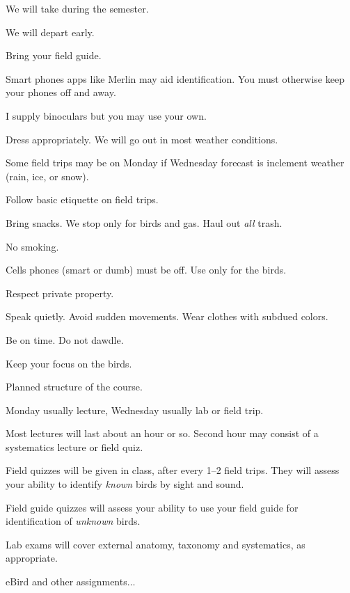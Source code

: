 \documentclass[t]{beamer}
\begin{document}
\begin{frame}[t,plain]{We will take  during the semester.}

	\vspace{-0.5\baselineskip}
	
	\hangpara {}
	
	\hangpara We will depart early. 
	
	\hangpara Bring your field guide.

	\hangpara Smart phones apps like Merlin may aid identification. You must otherwise keep your phones off and away.

	\hangpara I supply binoculars but you may use your own. 

	\hangpara Dress appropriately. We will go out in most weather conditions.
		
	\hangpara Some field trips may be on Monday if Wednesday forecast is inclement weather (rain, ice, or snow).
	
\end{frame}

\begin{frame}[t,plain]{Follow basic etiquette on field trips.}

	\vspace{-0.5\baselineskip}
	
	\hangpara Bring snacks. We stop only for birds and gas. Haul out \textit{all} trash.
	
	\hangpara No smoking.
	
	\hangpara Cells phones (smart or dumb) must be off. Use only for the birds.

	\hangpara Respect private property.
	
	\hangpara Speak quietly. Avoid sudden movements. Wear clothes with subdued colors.
	
	\hangpara Be on time. Do not dawdle.
	
	\hangpara Keep your focus on the birds.
	
\end{frame}

\begin{frame}[t]{Planned structure of the course.}

\vspace{-\baselineskip}

\hangpara Monday usually lecture, Wednesday usually lab or field trip.

\hangpara Most lectures will last about an hour or so. Second hour may consist of a systematics lecture or field quiz.

\hangpara Field quizzes will be given in class, after every 1–2 field trips. They will assess your ability to identify \textit{known} birds by sight and sound. 

\hangpara Field guide quizzes will assess your ability to use your field guide for identification of \textit{unknown} birds.

\hangpara Lab exams will cover external anatomy, taxonomy and systematics, as appropriate.

\hangpara eBird and other assignments$\dots$

\end{frame}
\end{document}
